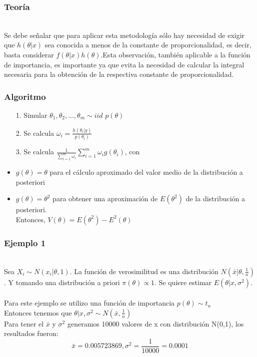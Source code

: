\documentclass[12pt]{beamer}
\begin{document}
\begin{frame}
\frametitle{Teoría}
~\\ Se debe señalar que para aplicar esta metodología sólo hay necesidad de exigir que $h(\theta|x)$ sea conocida a menos de la constante de proporcionalidad, es decir, basta considerar $f(\theta|x)h(\theta)$.Esta observación, también aplicable a la función de importancia, es importante ya que evita la necesidad de calcular la integral necesaria para la obtención de la respectiva constante de proporcionalidad.
\end{frame}

\begin{frame}
\frametitle{Algoritmo}
\begin{itemize}
\item[1.]Simular $\theta_{1},\theta_{2},...,\theta_{m}\sim iid$  $p(\theta)$
\item[2.]Se calcula $\omega_{i}=\frac{h(\theta_{i}|y)}{p(\theta_{i})}$
\item[3.]Se calcula $\frac{1}{\sum_{i=1}^{m}\omega_{i}}\sum_{i=1}^{m}\omega_{i}g(\theta_{i})$, con
\item $g(\theta)=\theta$ para el cálculo aproximado del valor medio de la distribución a posteriori
\item $g(\theta)=\theta^{2}$ para obtener una aproximación de $E(\theta^2)$ de la distribución a posteriori.
~\\Entonces, $V(\theta)=E(\theta^2)-E^2(\theta)$
\end{itemize}
\end{frame}

\begin{frame}
\frametitle{Ejemplo 1}
~\\Sea $X_{i}\sim N(x_{i}|\theta,1)$. La función de verosimilitud es una distribución $N(\bar{x}|\theta,\frac{1}{n})$. Y tomando una distribución a priori $\pi(\theta)\propto 1$. Se quiere estimar $E(\theta|x,\sigma^2)$.\\
~\\Para este ejemplo se utilizo una función de importancia $p(\theta)\sim t_{n}$
~\\Entonces tenemos que $\theta|x,\sigma^2\sim N(\bar{x},\frac{1}{n})$
~\\Para tener el $\bar{x}$ y $\sigma^2$ generamos 10000 valores de x con distribución N(0,1), los resultados fueron:
$$\bar{x}=0.005723869, \sigma^2=\frac{1}{10000}=0.0001$$
\end{frame}
\end{document}
